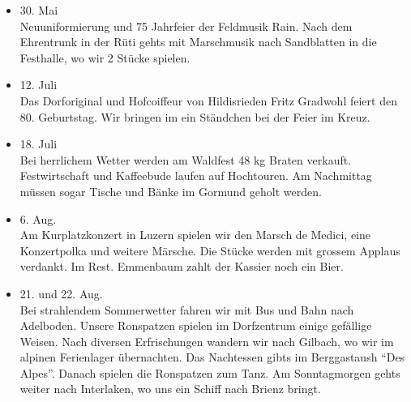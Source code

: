 \begin{history}
\begin{itemize}
        \item 30. Mai\\
              Neuuniformierung und 75 Jahrfeier der Feldmusik Rain. Nach dem
              Ehrentrunk in der Rüti gehts mit Marschmusik nach Sandblatten in die
              Festhalle, wo wir 2 Stücke spielen.

        \item 12. Juli\\
              Das Dorforiginal und Hofcoiffeur von Hildisrieden Fritz Gradwohl feiert
              den 80. Geburtstag. Wir bringen im ein Ständchen bei der Feier im Kreuz.

        \item 18. Juli\\
              Bei herrlichem Wetter werden am Waldfest 48 kg Braten verkauft.
              Festwirtschaft und Kaffeebude laufen auf Hochtouren. Am Nachmittag
              müssen sogar Tische und Bänke im Gormund geholt werden.

        \item 6. Aug.\\
              Am Kurplatzkonzert in Luzern spielen wir den Marsch de Medici, eine
              Konzertpolka und weitere Märsche. Die Stücke werden mit grossem Applaus
              verdankt. Im Rest. Emmenbaum zahlt der Kassier noch ein Bier.

        \item 21. und 22. Aug.\\
              Bei strahlendem Sommerwetter fahren wir mit Bus und Bahn nach Adelboden.
              Unsere Ronspatzen spielen im Dorfzentrum einige gefällige Weisen. Nach
              diversen Erfrischungen wandern wir nach Gilbach, wo wir im alpinen
              Ferienlager übernachten. Das Nachtessen gibts im Berggastaush \enquote{Des
                  Alpes}. Danach spielen die Ronspatzen zum Tanz. Am Sonntagmorgen gehts
              weiter nach Interlaken, wo uns ein Schiff nach Brienz bringt.


    \end{itemize}

\end{history}
